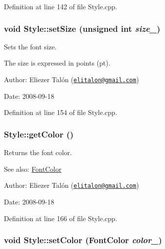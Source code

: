 Definition at line 142 of file Style.cpp.\hypertarget{class_style_b5044902245b464966c13ed6daccb4f3}{
\subsubsection[setSize]{\setlength{\rightskip}{0pt plus 5cm}void Style::setSize (unsigned int {\em size\_\-})}}
\label{class_style_b5044902245b464966c13ed6daccb4f3}


Sets the font size. 

The size is expressed in points (pt).

\begin{Desc}
\item[Author:]Eliezer Talón (\href{mailto:elitalon@gmail.com}{\tt elitalon@gmail.com}) \end{Desc}
\begin{Desc}
\item[Date:]2008-09-18 \end{Desc}


Definition at line 154 of file Style.cpp.\hypertarget{class_style_0cc67191ece90fc438835a20f2047669}{
\subsubsection[getColor]{ Style::getColor ()}}
\label{class_style_0cc67191ece90fc438835a20f2047669}


Returns the font color. 

\begin{Desc}
\item[See also:]\hyperlink{struct_font_color}{FontColor}\end{Desc}
\begin{Desc}
\item[Author:]Eliezer Talón (\href{mailto:elitalon@gmail.com}{\tt elitalon@gmail.com}) \end{Desc}
\begin{Desc}
\item[Date:]2008-09-18 \end{Desc}


Definition at line 166 of file Style.cpp.\hypertarget{class_style_0f9befe0f1b7956339d7068ebc024b9c}{
\subsubsection[setColor]{\setlength{\rightskip}{0pt plus 5cm}void Style::setColor ({\bf FontColor} {\em color\_\-})}}
\label{class_style_0f9befe0f1b7956339d7068ebc024b9c}


